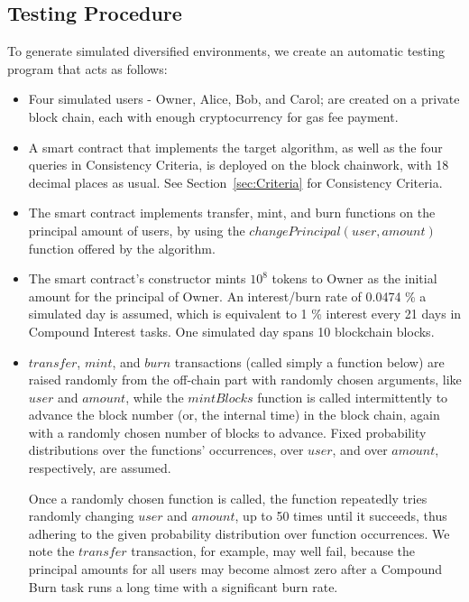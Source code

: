 \documentclass{article}
\begin{document}
\subsection{Testing Procedure}
\label{sec:TestingProcedure}
To generate simulated diversified environments, we create an automatic testing 
program that acts as follows:

\begin{itemize}
  \item Four simulated users - Owner, Alice, Bob, and Carol; are created on a private 
  block chain, each with enough cryptocurrency for gas fee payment.

  \item A smart contract that implements the target algorithm, as well as the 
  four queries in Consistency Criteria, is deployed on the block chainwork, with 18 
  decimal places as usual. See Section~\ref{sec:Criteria} for Consistency Criteria.

  \item The smart contract implements transfer, mint, and burn functions on the principal 
  amount of users, by using the $changePrincipal(user, amount)$ function offered 
  by the algorithm.

  \item The smart contract's constructor mints $10^8$ tokens to Owner as the initial 
  amount for the principal of Owner. An interest/burn rate of 0.0474 \% 
  a simulated day is assumed, which is equivalent to 1 \% interest every 21 days 
  in Compound Interest tasks.
  One simulated day spans 10 blockchain blocks.

  \item $transfer$, $mint$, and $burn$ transactions (called simply a function below) 
  are raised randomly from the off-chain part with randomly chosen arguments, 
  like $user$ and $amount$, while the $mintBlocks$ function is called intermittently 
  to advance the block number (or, the internal time) in the block chain, 
  again with a randomly chosen number of blocks to advance.
  Fixed probability distributions over the functions' occurrences, 
  over $user$, and over $amount$, respectively, are assumed.

  Once a randomly chosen function is called, the function repeatedly tries 
  randomly changing $user$ and $amount$, up to 50 times  
  until it succeeds, thus adhering to the given 
  probability distribution over function occurrences.
  We note the $transfer$ transaction, for example, may well 
  fail, because the principal amounts for all users may become almost zero 
  after a Compound Burn task runs a long time with a significant burn rate.


\end{itemize}
\end{document}
